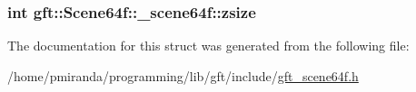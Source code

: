 \subsubsection[{\texorpdfstring{zsize}{zsize}}]{\setlength{\rightskip}{0pt plus 5cm}int gft\+::\+Scene64f\+::\+\_\+scene64f\+::zsize}\hypertarget{structgft_1_1Scene64f_1_1__scene64f_a1246232c6a1828badcc862f6dc3259a9}{}\label{structgft_1_1Scene64f_1_1__scene64f_a1246232c6a1828badcc862f6dc3259a9}


The documentation for this struct was generated from the following file\+:\begin{DoxyCompactItemize}
\item 
/home/pmiranda/programming/lib/gft/include/\hyperlink{gft__scene64f_8h}{gft\+\_\+scene64f.\+h}\end{DoxyCompactItemize}
